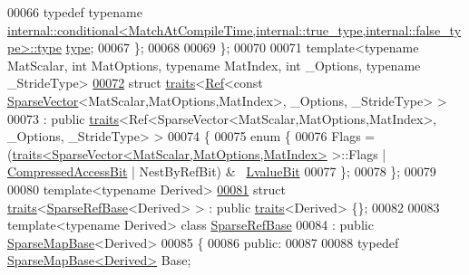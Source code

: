 \begin{DoxyCode}
00066     \textcolor{keyword}{typedef} \textcolor{keyword}{typename} 
      \hyperlink{class_eigen_1_1internal_1_1_tensor_lazy_evaluator_writable}{internal::conditional<MatchAtCompileTime,internal::true\_type,internal::false\_type>::type}
       \hyperlink{class_eigen_1_1internal_1_1_tensor_lazy_evaluator_writable}{type};
00067   \};
00068 
00069 \};
00070 
00071 \textcolor{keyword}{template}<\textcolor{keyword}{typename} MatScalar, \textcolor{keywordtype}{int} MatOptions, \textcolor{keyword}{typename} MatIndex, \textcolor{keywordtype}{int} \_Options, \textcolor{keyword}{typename} \_Str\textcolor{keywordtype}{id}eType>
\hyperlink{struct_eigen_1_1internal_1_1traits_3_01_ref_3_01const_01_sparse_vector_3_01_mat_scalar_00_01_mat15c4780d000a619e80140ca70456913a}{00072} \textcolor{keyword}{struct }\hyperlink{struct_eigen_1_1internal_1_1traits}{traits}<\hyperlink{group___core___module_class_eigen_1_1_ref}{Ref}<const \hyperlink{group___sparse_core___module_class_eigen_1_1_sparse_vector}{SparseVector}<MatScalar,MatOptions,MatIndex>, \_Options, 
      \_StrideType> >
00073   : \textcolor{keyword}{public} \hyperlink{struct_eigen_1_1internal_1_1traits}{traits}<Ref<SparseVector<MatScalar,MatOptions,MatIndex>, \_Options, \_StrideType> >
00074 \{
00075   \textcolor{keyword}{enum} \{
00076     Flags = (\hyperlink{struct_eigen_1_1internal_1_1traits}{traits<SparseVector<MatScalar,MatOptions,MatIndex>}
       >::Flags | \hyperlink{group__flags_gaed0244284da47a2b8661261431173caf}{CompressedAccessBit} | NestByRefBit) & ~\hyperlink{group__flags_gae2c323957f20dfdc6cb8f44428eaec1a}{LvalueBit}
00077   \};
00078 \};
00079 
00080 \textcolor{keyword}{template}<\textcolor{keyword}{typename} Derived>
\hyperlink{struct_eigen_1_1internal_1_1traits_3_01_sparse_ref_base_3_01_derived_01_4_01_4}{00081} \textcolor{keyword}{struct }\hyperlink{struct_eigen_1_1internal_1_1traits}{traits}<\hyperlink{class_eigen_1_1internal_1_1_sparse_ref_base}{SparseRefBase}<Derived> > : \textcolor{keyword}{public} \hyperlink{struct_eigen_1_1internal_1_1traits}{traits}<Derived> \{\};
00082 
00083 \textcolor{keyword}{template}<\textcolor{keyword}{typename} Derived> \textcolor{keyword}{class }\hyperlink{class_eigen_1_1internal_1_1_sparse_ref_base}{SparseRefBase}
00084   : \textcolor{keyword}{public} \hyperlink{class_eigen_1_1_sparse_map_base}{SparseMapBase}<Derived>
00085 \{
00086 \textcolor{keyword}{public}:
00087 
00088   \textcolor{keyword}{typedef} \hyperlink{class_eigen_1_1_sparse_map_base}{SparseMapBase<Derived>} Base;

\end{DoxyCode}
